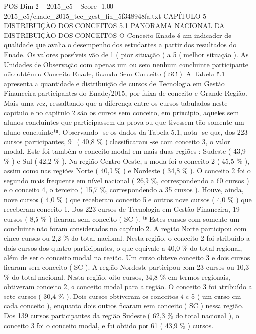 \begin{textsample}{POS Dim 2 – 2015\_c5 – Score -1.00 – 2015\_c5/enade\_2015\_tec\_gest\_fin\_5f348948fa.txt}  \label{ex:f2_pos_279}
CAPÍTULO 5 DISTRIBUIÇÃO DOS CONCEITOS 5.1 PANORAMA NACIONAL DA DISTRIBUIÇÃO DOS CONCEITOS O Conceito Enade é um indicador de qualidade que avalia o desempenho dos estudantes a partir dos resultados do Enade.
Os valores possíveis vão de 1 ( pior situação ) a 5 ( melhor situação ).
As Unidades de Observação com apenas um ou sem nenhum concluinte participante não obtêm o Conceito Enade, ficando Sem Conceito ( SC ).
A Tabela 5.1 apresenta a quantidade e distribuição de cursos de Tecnologia em Gestão Financeira participantes do Enade/2015, por faixa de conceito e Grande Região.
Mais uma vez, ressaltando que a diferença entre os cursos tabulados neste capítulo e no capítulo 2 são os cursos sem conceito, em princípio, aqueles sem alunos concluintes que participassem da prova ou que tivessem tão somente um aluno concluinte¹⁸.
Observando -se os dados da Tabela 5.1, nota -se que, dos 223 cursos participantes, 91 ( 40,8 \% ) classificaram -se com conceito 3, o valor modal.
Este foi também o conceito modal em mais duas regiões : Sudeste ( 43,9 \% ) e Sul ( 42,2 \% ).
Na região Centro-Oeste, a moda foi o conceito 2 ( 45,5 \% ), assim como nas regiões Norte ( 40,0 \% ) e Nordeste ( 34,8 \% ).
O conceito 2 foi o segundo mais frequente em nível nacional ( 26,9 \%, correspondendo a 60 cursos ) e o conceito 4, o terceiro ( 15,7 \%, correspondendo a 35 cursos ).
Houve, ainda, nove cursos ( 4,0 \% ) que receberam conceito 5 e outros nove cursos ( 4,0 \% ) que receberam conceito 1.
Dos 223 cursos de Tecnologia em Gestão Financeira, 19 cursos ( 8,5 \% ) ficaram sem conceito ( SC ). ¹⁸ Estes cursos com somente um concluinte não foram considerados no capítulo 2.
A região Norte participou com cinco cursos ou 2,2 \% do total nacional.
Nesta região, o conceito 2 foi atribuído a dois cursos dos quatro participantes, o que equivale a 40,0 \% do total regional, além de ser o conceito modal na região.
Um curso obteve conceito 3 e dois cursos ficaram sem conceito ( SC ).
A região Nordeste participou com 23 cursos ou 10,3 \% do total nacional.
Nesta região, oito cursos, 34,8 \% em termos regionais, obtiveram conceito 2, o conceito modal para a região.
O conceito 3 foi atribuído a sete cursos ( 30,4 \% ).
Dois cursos obtiveram os conceitos 4 e 5 ( um curso em cada conceito ), enquanto dois outros ficaram sem conceito ( SC ) nessa região.
Dos 139 cursos participantes da região Sudeste ( 62,3 \% do total nacional ), o conceito 3 foi o conceito modal, e foi obtido por 61 ( 43,9 \% ) cursos.

\end{textsample}
